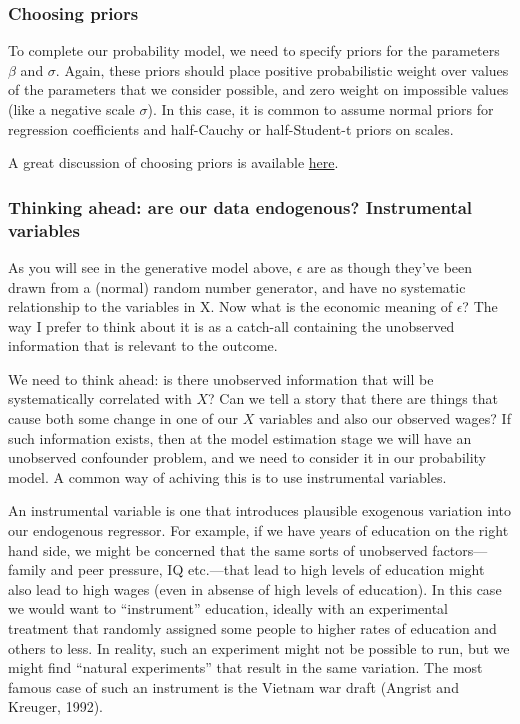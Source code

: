 \documentclass[]{book}
\begin{document}
\subsubsection{Choosing priors}\label{choosing-priors}

To complete our probability model, we need to specify priors for the
parameters \(\beta\) and \(\sigma\). Again, these priors should place
positive probabilistic weight over values of the parameters that we
consider possible, and zero weight on impossible values (like a negative
scale \(\sigma\)). In this case, it is common to assume normal priors
for regression coefficients and half-Cauchy or half-Student-t priors on
scales.

A great discussion of choosing priors is available
\href{github.com/stan-dev/wiki}{here}.

\subsubsection{Thinking ahead: are our data endogenous? Instrumental
variables}\label{thinking-ahead-are-our-data-endogenous-instrumental-variables}

As you will see in the generative model above, \(\epsilon\) are as
though they've been drawn from a (normal) random number generator, and
have no systematic relationship to the variables in X. Now what is the
economic meaning of \(\epsilon\)? The way I prefer to think about it is
as a catch-all containing the unobserved information that is relevant to
the outcome.

We need to think ahead: is there unobserved information that will be
systematically correlated with \(X\)? Can we tell a story that there are
things that cause both some change in one of our \(X\) variables and
also our observed wages? If such information exists, then at the model
estimation stage we will have an unobserved confounder problem, and we
need to consider it in our probability model. A common way of achiving
this is to use instrumental variables.

An instrumental variable is one that introduces plausible exogenous
variation into our endogenous regressor. For example, if we have years
of education on the right hand side, we might be concerned that the same
sorts of unobserved factors---family and peer pressure, IQ etc.---that
lead to high levels of education might also lead to high wages (even in
absense of high levels of education). In this case we would want to
``instrument'' education, ideally with an experimental treatment that
randomly assigned some people to higher rates of education and others to
less. In reality, such an experiment might not be possible to run, but
we might find ``natural experiments'' that result in the same variation.
The most famous case of such an instrument is the Vietnam war draft
(Angrist and Kreuger, 1992).
\end{document}
